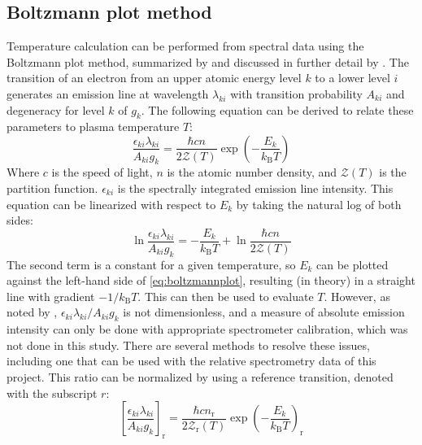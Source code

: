         \subsection{Boltzmann plot method}
            Temperature calculation can be performed from spectral data using the Boltzmann plot method, summarized by \textcite{ohnoValidityElectronTemperature2006} and discussed in further detail by \textcite{griemSpectroscopicTemperatureMeasurements1997}. The transition of an electron from an upper atomic energy level $k$ to a lower level $i$  generates an emission line at wavelength $\lambda_{ki}$ with transition probability $A_{ki}$ and degeneracy for level $k$ of $g_k$. The following equation can be derived to relate these parameters to plasma temperature $T$:
            \begin{equation} \label{eq:transition_energy}
                \frac{\epsilon_{ki}\lambda_{ki}}{A_{ki}g_k} = \frac{\hbar cn}{2 \mathcal{Z}(T)}\exp{\left(-\frac{E_k}{k_\mathrm{B}T}\right)}
            \end{equation}
            Where $c$ is the speed of light, $n$ is the atomic number density, and $\mathcal{Z}(T)$ is the partition function. $\epsilon_{ki}$ is the spectrally integrated emission line intensity. This equation can be linearized with respect to $E_k$ by taking the natural log of both sides:
            \begin{equation} \label{eq:boltzmannplot}
                \ln{\frac{\epsilon_{ki}\lambda_{ki}}{A_{ki}g_k}} = -\frac{E_k}{k_\mathrm{B}T} + \ln{\frac{\hbar cn}{2 \mathcal{Z}(T)}}
            \end{equation}
            The second term is a constant for a given temperature, so $E_k$ can be plotted against the left-hand side of \autoref{eq:boltzmannplot}, resulting (in theory) in a straight line with gradient $-1/k_\mathrm{B}T$. This can then be used to evaluate $T$. However, as noted by \textcite{volkerImportancePhysicalUnits2022}, $\epsilon_{ki}\lambda_{ki}/A_{ki}g_k$ is not dimensionless, and a measure of absolute emission intensity can only be done with appropriate spectrometer calibration, which was not done in this study. There are several methods to resolve these issues, including one that can be used with the relative spectrometry data of this project. This ratio can be normalized by using a reference transition, denoted with the subscript $r$:
            \begin{equation} \label{eq:reference_transition}
                \left[\frac{\epsilon_{ki}\lambda_{ki}}{A_{ki}g_k}\right]_\mathrm{r} = \frac{\hbar cn_\mathrm{r}}{2 \mathcal{Z}_\mathrm{r}(T)}\exp{\left(-\frac{E_k}{k_\mathrm{B}T}\right)_\mathrm{r}}
            \end{equation}
